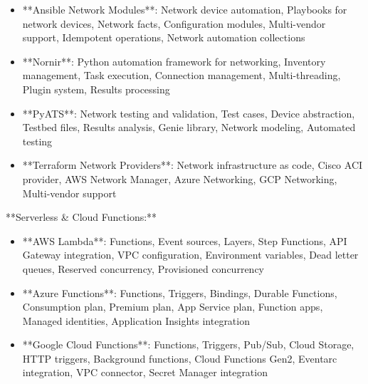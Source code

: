 \documentclass[11pt,a4paper]{article}
\begin{document}
\begin{itemize}
\item **Ansible Network Modules**: Network device automation, Playbooks for network devices, Network facts, Configuration modules, Multi-vendor support, Idempotent operations, Network automation collections
\end{itemize}

\begin{itemize}
\item **Nornir**: Python automation framework for networking, Inventory management, Task execution, Connection management, Multi-threading, Plugin system, Results processing
\end{itemize}

\begin{itemize}
\item **PyATS**: Network testing and validation, Test cases, Device abstraction, Testbed files, Results analysis, Genie library, Network modeling, Automated testing
\end{itemize}

\begin{itemize}
\item **Terraform Network Providers**: Network infrastructure as code, Cisco ACI provider, AWS Network Manager, Azure Networking, GCP Networking, Multi-vendor support
\end{itemize}

**Serverless \& Cloud Functions:**

\begin{itemize}
\item **AWS Lambda**: Functions, Event sources, Layers, Step Functions, API Gateway integration, VPC configuration, Environment variables, Dead letter queues, Reserved concurrency, Provisioned concurrency
\end{itemize}

\begin{itemize}
\item **Azure Functions**: Functions, Triggers, Bindings, Durable Functions, Consumption plan, Premium plan, App Service plan, Function apps, Managed identities, Application Insights integration
\end{itemize}

\begin{itemize}
\item **Google Cloud Functions**: Functions, Triggers, Pub/Sub, Cloud Storage, HTTP triggers, Background functions, Cloud Functions Gen2, Eventarc integration, VPC connector, Secret Manager integration
\end{itemize}
\end{document}
